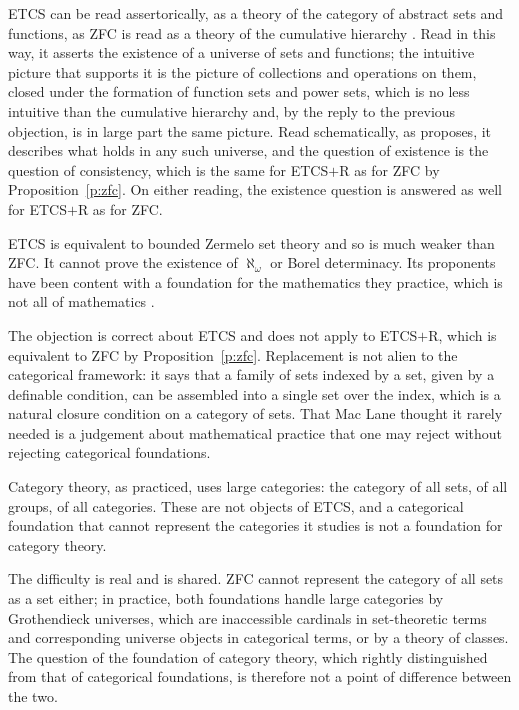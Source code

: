 \documentclass{situationist-preprint}
\begin{document}
\begin{reply}
ETCS can be read assertorically, as a theory of the category of abstract sets and functions, as ZFC is read as a theory of the cumulative hierarchy \citep{McLarty2004}. Read in this way, it asserts the existence of a universe of sets and functions; the intuitive picture that supports it is the picture of collections and operations on them, closed under the formation of function sets and power sets, which is no less intuitive than the cumulative hierarchy and, by the reply to the previous objection, is in large part the same picture. Read schematically, as \citet{Awodey2004} proposes, it describes what holds in any such universe, and the question of existence is the question of consistency, which is the same for ETCS$+$R as for ZFC by Proposition~\ref{p:zfc}. On either reading, the existence question is answered as well for ETCS$+$R as for ZFC.
\end{reply}

\begin{objection}[Weakness]
ETCS is equivalent to bounded Zermelo set theory and so is much weaker than ZFC. It cannot prove the existence of $\aleph_\omega$ or Borel determinacy. Its proponents have been content with a foundation for the mathematics they practice, which is not all of mathematics \citep{Mathias2001}.
\end{objection}

\begin{reply}
The objection is correct about ETCS and does not apply to ETCS$+$R, which is equivalent to ZFC by Proposition~\ref{p:zfc}. Replacement is not alien to the categorical framework: it says that a family of sets indexed by a set, given by a definable condition, can be assembled into a single set over the index, which is a natural closure condition on a category of sets. That Mac Lane thought it rarely needed is a judgement about mathematical practice that one may reject without rejecting categorical foundations.
\end{reply}

\begin{objection}
Category theory, as practiced, uses large categories: the category of all sets, of all groups, of all categories. These are not objects of ETCS, and a categorical foundation that cannot represent the categories it studies is not a foundation for category theory.
\end{objection}

\begin{reply}
The difficulty is real and is shared. ZFC cannot represent the category of all sets as a set either; in practice, both foundations handle large categories by Grothendieck universes, which are inaccessible cardinals in set-theoretic terms and corresponding universe objects in categorical terms, or by a theory of classes. The question of the foundation of category theory, which \citet{Feferman1977} rightly distinguished from that of categorical foundations, is therefore not a point of difference between the two.
\end{reply}
\end{document}

